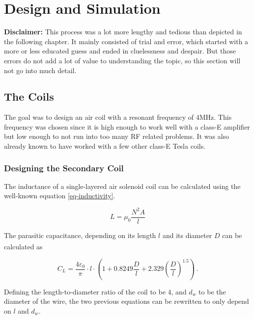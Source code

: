 \setchapterpreamble[u]{\margintoc}

\chapter{Design and Simulation} %
\label{ch:design-and-simulation}

\textbf{Disclaimer:} This process was a lot more lengthy and tedious than depicted in the following chapter. It mainly consisted of trial and error, which started with a more or less educated guess and ended in cluelessness and despair. But those errors do not add a lot of value to understanding the topic, so this section will not go into much detail.

\section{The Coils}

The goal was to design an air coil with a resonant frequency of 4MHz. This frequency was chosen since it is high enough to work well with a class-E amplifier but low enough to not run into too many RF related problems. It was also already known to have worked with a few other class-E Tesla coils.

\subsection{Designing the Secondary Coil}
\label{subsec:designing-the-secondary-coil}

The inductance of a single-layered air solenoid coil can be calculated using the well-known equation \ref{eq-inductivity}.

\begin{equation}\label{eq-inductivity}
    L = \mu_0 \frac{N^2 A}{l}
\end{equation}

The parasitic capacitance, depending on its length \(l\) and its diameter \(D\) can be calculated as\textsuperscript{}

\begin{equation}\label{eq-parasitic-capacitance}
    C_L = \frac{4\varepsilon_0}{\pi} \cdot l \cdot \left( 1 + 0.8249 \frac{D}{l} + 2.329 \left(\frac{D}{l}\right)^{1.5}\right)\,.
\end{equation}

Defining the length-to-diameter ratio of the coil to be \(4\), and \(d_w\) to be the diameter of the wire, the two previous equations can be rewritten to only depend on \(l\) and \(d_w\). 

